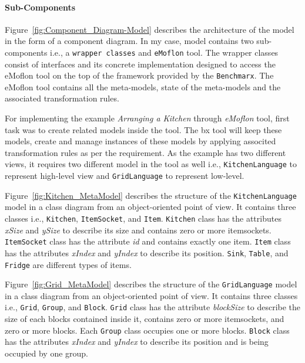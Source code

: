 \paragraph{Sub-Components}
Figure~\ref{fig:Component_Diagram-Model} describes the architecture of the model in the form of a component diagram. In my case, model contains two sub-components i.e., a \texttt{wrapper classes} and \texttt{eMoflon} tool. The wrapper classes consist of interfaces and its concrete implementation designed to access the eMoflon tool on the top of the framework provided by the \texttt{Benchmarx}. The eMoflon tool contains all the meta-models, state of the meta-models and the associated transformation rules.

For implementing the example \textit{Arranging a Kitchen} through \textit{eMoflon} tool, first task was to create related models inside the tool. The bx tool will keep these models, create and manage instances of these models by applying associted transformation rules as per the requirement. As the example has two different views, it requires two different model in the tool as well i.e., \texttt{KitchenLanguage} to represent high-level view and \texttt{GridLanguage} to represent low-level.

Figure~\ref{fig:Kitchen_MetaModel} describes the structure of the \texttt{KitchenLanguage} model in a class diagram from an object-oriented point of view. It contains three classes i.e., \texttt{Kitchen}, \texttt{ItemSocket}, and \texttt{Item}. \texttt{Kitchen} class has the attributes \textit{xSize} and \textit{ySize} to describe its size and contains zero or more itemsockets. \texttt{ItemSocket} class has the attribute \textit{id} and contains exactly one item. \texttt{Item} class has the attributes \textit{xIndex} and \textit{yIndex} to describe its position. \texttt{Sink}, \texttt{Table}, and \texttt{Fridge} are different types of items.

Figure~\ref{fig:Grid_MetaModel} describes the structure of the \texttt{GridLanguage} model in a class diagram from an object-oriented point of view. It contains three classes i.e., \texttt{Grid}, \texttt{Group}, and \texttt{Block}. \texttt{Grid} class has the attribute \textit{blockSize} to describe the size of each blocks contained inside it, contains zero or more itemsockets, and zero or more blocks. Each \texttt{Group} class occupies one or more blocks. \texttt{Block} class has the attributes \textit{xIndex} and \textit{yIndex} to describe its position and is being occupied by one group.


